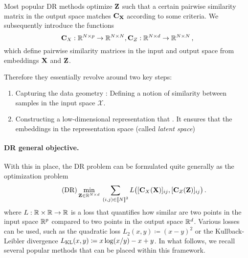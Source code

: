 Most popular DR methods optimize ${\mathbf{Z}}$ such that a certain pairwise similarity matrix in the output space matches ${\mathbf{C}}_{{\mathbf{X}}}$ according to some criteria. We subsequently introduce the functions
\begin{equation}
\label{eq:sim_function}
{\mathbf{C}}_{X}: \mathbb{R}^{N \times p} \to \mathbb{R}^{N \times N}, {\mathbf{C}}_{Z}: \mathbb{R}^{N \times d} \to \mathbb{R}^{N \times N}\,,
\end{equation}
which define pairwise similarity matrices in the input and output space from embeddings ${\mathbf{X}}$ and ${\mathbf{Z}}$.


Therefore they essentially revolve around two key steps:

\begin{enumerate}
	\item Capturing the data geometry : Defining a notion of similarity between samples in the input space $\mathcal{X}$.
	\item Constructing a low-dimensional representation that . It ensures that the embeddings in the representation space (called \emph{latent space}) 
\end{enumerate}


 
\paragraph{DR general objective.} With this in place, the DR problem can be formulated quite generally as the optimization problem
\begin{equation}
\label{eq:DR_criterion}\tag{DR}
\min_{\mZ \in \R^{N \times d}} \: \sum_{(i,j) \in \integ{N}^2}  L\big([\simiX(\mX)]_{ij}, [\simi(\mZ)]_{ij}\big) \,. %
\end{equation}
where $L:\mathbb{R} \times \mathbb{R} \rightarrow \mathbb{R}$ is a loss that quantifies how similar are two points in the input space $\mathbb{R}^{p}$ compared to two points in the output space $\mathbb{R}^{d}$. Various losses can be used, such as the quadratic loss $L_2(x,y) \coloneqq (x - y)^2$
or the Kullback-Leibler divergence $L_{\operatorname{KL}}(x,y) \coloneqq x \log (x/y) - x +y$.
In what follows, we recall several popular methods that can be placed within this framework.



